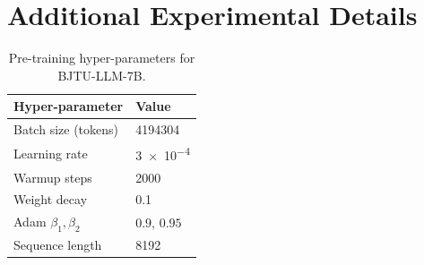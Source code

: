 \section{Additional Experimental Details}
\label{app:hparams}
\lipsum[1]

\begin{table}[h]
    \centering
    \small\sffamily
    \begin{tabular}{ll}
        \toprule
        \textbf{Hyper-parameter} & \textbf{Value} \\
        \midrule
        Batch size (tokens)      & \num{4194304} \\
        Learning rate            & \num{3e-4} \\
        Warmup steps             & \num{2000} \\
        Weight decay             & \num{0.1} \\
        Adam $\beta_1, \beta_2$  & $0.9,\,0.95$ \\
        Sequence length          & \num{8192} \\
        \bottomrule
    \end{tabular}
    \caption{Pre-training hyper-parameters for BJTU-LLM-7B.}
    \label{tab:hparams}
\end{table}
